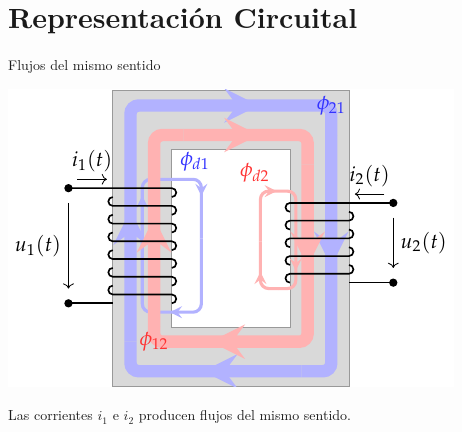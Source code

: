 \documentclass[aspectratio=169, usenames,svgnames,dvipsnames]{beamer}
\begin{document}
\section{Representación Circuital}
\label{sec:orga6fe635}
\begin{frame}[label={sec:org536b6d9}]{Flujos del mismo sentido}
\begin{center}
\includegraphics[height=0.75\textheight]{../figs/acoplamientoTikz.pdf}
\end{center}

\begin{center}
Las corrientes \(i_1\) e \(i_2\) producen flujos del mismo sentido.
\end{center}
\end{frame}
\end{document}
